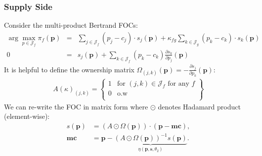 \documentclass[xcolor=pdftex,dvipsnames,table,mathserif,aspectratio=169]{beamer}
\begin{document}
\begin{frame}[plain]
\frametitle{Supply Side}
Consider the multi-product Bertrand FOCs:
\footnotesize
{\begin{eqnarray*}
\arg \max_{p \in \mathcal{J}_f} \pi_f (\mathbf{p}) &=& \sum_{j \in \mathcal{J}_f} (p_j - c_j) \cdot s_j(\mathbf{p}) +  \kappa_{fg}\sum_{k \in \mathcal{J}_g} (p_k - c_k) \cdot s_k(\mathbf{p}) \\
0&=& s_j(\mathbf{p}) + \sum_{k \in \mathcal{J}_f} (p_k - c_k) \frac{\partial s_{k}}{\partial p_j}(\mathbf{p}) 
\end{eqnarray*}
}
It is helpful to define the \alert{ownership matrix} $\Omega_{(j,k)}(\mathbf{p})  = - \frac{\partial s_{j}}{\partial p_k}(\mathbf{p})$:
\begin{eqnarray*}
A(\kappa)_{(j,k)} = \left\{\begin{array}{lr}
          1 & \text{for }  (j,k) \in \mathcal{J}_f \text{ for any } f \\ 
	  0 & \text{o.w}\\
        \end{array} \right\}
\end{eqnarray*}
We can re-write the FOC in matrix form where $\odot$ denotes Hadamard product (element-wise):
\begin{eqnarray*}
        s(\mathbf{p}) &= (A \odot \Omega(\mathbf{p})) \cdot (\mathbf{p} - \mathbf{mc}), \\
       \mathbf{mc} &=  \mathbf{p} - \underbrace{(A \odot \Omega(\mathbf{p}))^{-1} s(\mathbf{p})}_{\eta(\mathbf{p},\mathbf{s},\theta_2)}.
\end{eqnarray*}
\end{frame}
\end{document}
